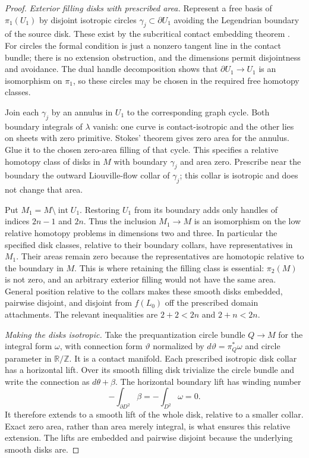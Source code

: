 \documentclass[11pt]{article}
\numberwithin{equation}{section}
\theoremstyle{definition}
\theoremstyle{remark}
\begin{document}
\begin{proof}
\emph{Exterior filling disks with prescribed area.}
Represent a free basis of $\pi_1(U_1)$ by disjoint isotropic
circles $\gamma_j\subset\partial U_1$ avoiding the Legendrian
boundary of the source disk.  These exist by the subcritical
contact embedding theorem \cite[Theorem~12.4.1]{Top:EMbook}.
For circles the formal condition is just a nonzero tangent line
in the contact bundle; there is no extension obstruction, and
the dimensions permit disjointness and avoidance.  The dual
handle decomposition shows that
$\partial U_1\to U_1$ is an isomorphism on $\pi_1$, so these
circles may be chosen in the required free homotopy classes.

Join each $\gamma_j$ by an annulus in $U_1$ to the corresponding
graph cycle.  Both boundary integrals of $\lambda$ vanish:
one curve is contact-isotropic and the other lies on sheets with
zero primitive.  Stokes' theorem gives zero area for the
annulus.  Glue it to the chosen zero-area filling of that cycle.
This specifies a relative homotopy class of disks in $M$ with
boundary $\gamma_j$ and area zero.  Prescribe near the boundary
the outward Liouville-flow collar of $\gamma_j$; this collar is
isotropic and does not change that area.

Put $M_1=M\setminus\operatorname{int}U_1$.  Restoring $U_1$
from its boundary adds only handles of indices $2n-1$ and
$2n$.  Thus the inclusion $M_1\to M$ is an isomorphism on the
low relative homotopy problems in dimensions two and three.
In particular the specified disk classes, relative to their
boundary collars, have representatives in $M_1$.  Their areas
remain zero because the representatives are homotopic relative
to the boundary in $M$.  This is where retaining the filling
class is essential: $\pi_2(M)$ is not zero, and an arbitrary
exterior filling would not have the same area.
General position relative to the collars makes these smooth
disks embedded, pairwise disjoint, and disjoint from $f(L_0)$
off the prescribed domain attachments.  The relevant
inequalities are $2+2<2n$ and $2+n<2n$.

\emph{Making the disks isotropic.}
Take the prequantization circle bundle $Q\to M$ for the
integral form $\omega$, with connection form $\vartheta$
normalized by $d\vartheta=\pi_Q^*\omega$ and circle parameter
in $\mathbb R/\mathbb Z$.  It is a contact manifold.  Each prescribed
isotropic disk collar has a horizontal lift.  Over its smooth
filling disk trivialize the circle bundle and write the
connection as $d\theta+\beta$.  The horizontal boundary lift
has winding number
\begin{equation}\label{top:eq:zero-winding}
       -\int_{\partial D^2}\beta=-\int_{D^2}\omega=0.
\end{equation}
It therefore extends to a smooth lift of the whole disk,
relative to a smaller collar.  Exact zero area, rather than
area merely integral, is what ensures this relative extension.
The lifts are embedded and pairwise disjoint because the
underlying smooth disks are.


\end{proof}
\end{document}
